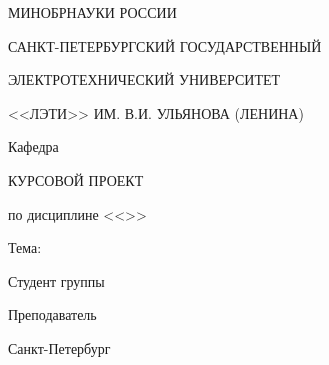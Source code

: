 \begin{titlepage}

\thispagestyle{empty}

\centerline{МИНОБРНАУКИ РОССИИ}
\centerline{САНКТ-ПЕТЕРБУРГСКИЙ ГОСУДАРСТВЕННЫЙ}
\centerline{ЭЛЕКТРОТЕХНИЧЕСКИЙ УНИВЕРСИТЕТ}
\centerline{<<ЛЭТИ>> ИМ. В.И. УЛЬЯНОВА (ЛЕНИНА)}
\centerline{Кафедра \caphedre}

\vfill

\centerline{\large{\textsc{КУРСОВОЙ ПРОЕКТ}}}
\centerline{\large{по дисциплине <<\discipline>>}}
\centerline{\large{Тема: \theme}}

\vfill

Студент группы \groupnumber \hfill \studentname

Преподаватель \hfill \teachername

\vfill

\centerline{Санкт-Петербург}
\centerline{\myyear}
\clearpage
\end{titlepage}
\setcounter{page}{2}